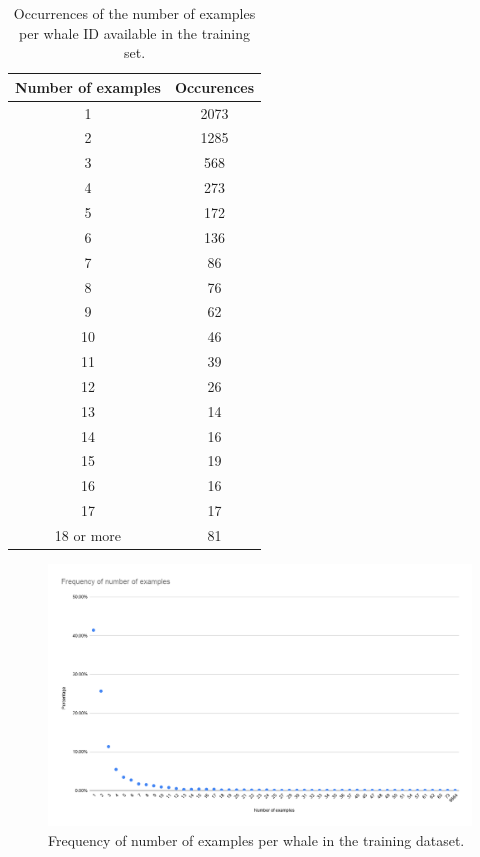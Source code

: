 \documentclass[12pt,
    brazil,			%
	english,        %
	]{article}
\begin{document}
\begin{table}[htb]
    \centering
    \setlength{\tabcolsep}{25pt} %
    \renewcommand{\arraystretch}{1.2} %
    \begin{tabular}{cc}
        \hline \hline
        Number of examples & Occurences \\ \hline
            1 & 2073 \\
            2 & 1285 \\
            3 & 568 \\
            4 & 273 \\
            5 & 172 \\
            6 & 136 \\
            7 & 86 \\
            8 & 76 \\
            9 & 62 \\
            10 & 46 \\
            11 & 39 \\
            12 & 26 \\
            13 & 14 \\
            14 & 16 \\
            15 & 19 \\
            16 & 16 \\
            17 & 17 \\
            18 or more & 81 \\
        \hline \hline
    \end{tabular}
    \caption{Occurrences of the number of examples per whale ID available in the training set.}
    \label{tab:occurrences-examples}
\end{table}

\begin{figure}[htb]
    \centering
    \includegraphics[width=0.95\textheight, angle=90]{images/graphs/frequency-examples.png}
    \caption{Frequency of number of examples per whale in the training dataset.}
    \label{fig:frequency-examples}
\end{figure}
\end{document}
